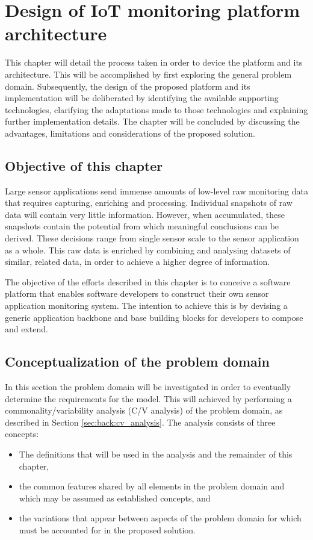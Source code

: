 \newcommand{\archid}{1}
\chapter{Design of IoT monitoring platform architecture}
\label{ch:architecture}
This chapter will detail the process taken in order to device the platform and its architecture. This will be accomplished by first exploring the general problem domain. Subsequently, the design of the proposed platform and its implementation will be deliberated by identifying the available supporting technologies, clarifying the adaptations made to those technologies and explaining further implementation details. The chapter will be concluded by discussing the advantages, limitations and considerations of the proposed solution.
\section{Objective of this chapter}
Large sensor applications send immense amounts of low-level raw monitoring data that requires capturing, enriching and processing. Individual snapshots of raw data will contain very little information. However, when accumulated, these snapshots contain the potential from which meaningful conclusions can be derived. These decisions range from single sensor scale to the sensor application as a whole. This raw data is enriched by combining and analysing datasets of similar, related data, in order to achieve a higher degree of information. 

The objective of the efforts described in this chapter is to conceive a software platform that enables software developers to construct their own sensor application monitoring system. The intention to achieve this is by devising a generic application backbone and base building blocks for  developers to compose and extend.  
\section{Conceptualization of the problem domain}
In this section the problem domain will be investigated in order to eventually determine the requirements for the model. This will achieved by performing a commonality/variability analysis (C/V analysis) of the problem domain, as described in Section \ref{sec:back:cv_analysis}. The analysis consists of three concepts:
\begin{itemize}
\nospace
\item The definitions that will be used in the analysis and the remainder of this chapter, 
\item the common features shared by all elements in the problem domain and which may be assumed as established concepts, and 
\item the variations that appear between aspects of the problem domain for which must be accounted for in the proposed solution.
\end{itemize}
